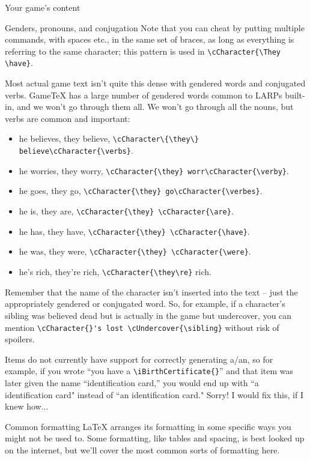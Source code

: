 \documentclass{article}
\newcommand{\gametex}{GameTeX}
\begin{document}
\begin{section}{Your game's content}
\begin{subsection}{Genders, pronouns, and conjugation}
Note that you can cheat by putting multiple commands, with spaces etc., in the same set of braces, as long as everything is referring to the same character; this pattern is used in \lstinline|\cCharacter{\They \have}|.

Most actual game text isn't quite this dense with gendered words and conjugated verbs.  \gametex{} has a large number of gendered words common to LARPs built-in, and we won't go through them all.  We won't go through all the nouns, but verbs are common and important:

\begin{itemize}
\item he believes, they believe, \lstinline|\cCharacter\{\they\} believe\cCharacter{\verbs}|.
\item he worries, they worry, \lstinline|\cCharacter{\they} worr\cCharacter{\verby}|.
\item he goes, they go, \lstinline|\cCharacter{\they} go\cCharacter{\verbes}|.
\item he is, they are, \lstinline|\cCharacter{\they} \cCharacter{\are}|.
\item he has, they have, \lstinline|\cCharacter{\they} \cCharacter{\have}|.
\item he was, they were, \lstinline|\cCharacter{\they} \cCharacter{\were}|.
\item he's rich, they're rich, \lstinline|\cCharacter{\they\re}| rich.
\end{itemize}

Remember that the name of the character isn't inserted into the text – just the appropriately gendered or conjugated word.  So, for example, if a character's sibling was believed dead but is actually in the game but undercover, you can mention \lstinline|\cCharacter{}'s lost \cUndercover{\sibling}| without risk of spoilers.


Items do not currently have support for correctly generating a/an, so for example, if you wrote ``you have a \lstinline|\iBirthCertificate{}|'' and that item was later given the name ``identification card,'' you would end up with ``a identification card" instead of ``an identification card." Sorry!  I would fix this, if I knew how...
\end{subsection}
\begin{subsection}{Common formatting}
LaTeX arranges its formatting in some specific ways you might not be used to.  Some formatting, like tables and spacing, is best looked up on the internet, but we'll cover the most common sorts of formatting here.


\end{subsection}
\end{section}
\end{document}

